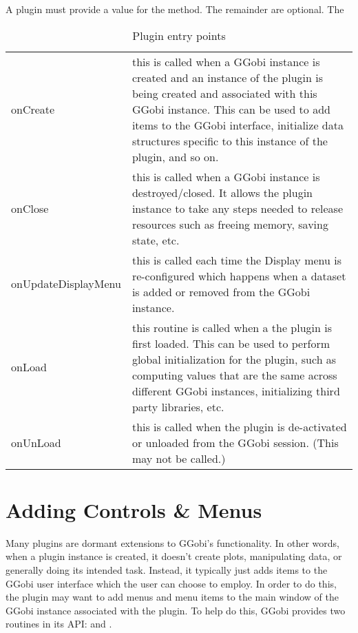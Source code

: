 \documentclass{article}
\begin{document}
A plugin must provide a value for the  method.
The remainder are optional.
The 
\begin{table}[htbp]
  \begin{center}
    \leavevmode
    \begin{tabular}{lp{4in}}
onCreate & 
this is called when a GGobi instance is created
and an instance of the plugin is being created
and associated with this GGobi instance.
This can be used to add items to the GGobi interface,
initialize data structures specific to this instance
of the plugin, and so on. \\
onClose & this is called when a GGobi instance
is destroyed/closed. It allows the plugin instance
to take any steps needed to release resources
such as freeing memory, saving state, etc. \\
onUpdateDisplayMenu & 
this is called each time the Display menu
is re-configured which happens when a
dataset is added or removed from the GGobi instance. 
\\
onLoad & this routine is called when a the plugin
is first loaded. This can be used
to perform global initialization 
for the plugin, such as computing values
that are the same across different GGobi
instances, initializing third party libraries, etc.
\\
onUnLoad & this is called when the plugin is de-activated
or unloaded from the GGobi session.
(This may not be called.)
    \end{tabular}
    \caption{Plugin entry points}
    \label{tab:entryPoints}
  \end{center}
\end{table}

\section{Adding Controls \& Menus}
Many plugins are dormant extensions to GGobi's functionality. In other
words, when a plugin instance is created, it doesn't create plots,
manipulating data, or generally doing its intended task.  Instead, it
typically just adds items to the GGobi user interface which the user
can choose to employ.  In order to do this, the plugin may want to add
menus and menu items to the main window of the GGobi instance
associated with the plugin.  To help do this,
GGobi provides two routines in its API:
and .
\end{document}
